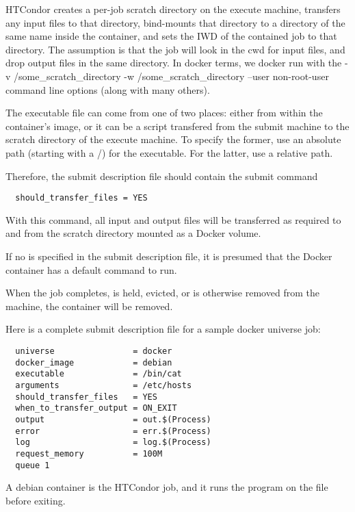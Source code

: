 HTCondor creates a per-job scratch directory on the execute machine, transfers 
any input files to that directory, bind-mounts that directory to a directory 
of the same name inside the container, and sets the IWD of the contained job 
to that directory.  The assumption is that the job will look in the cwd for 
input files, and drop output files in the same directory.  In docker 
terms, we docker run with the -v /some\_scratch\_directory 
-w /some\_scratch\_directory --user non-root-user command line options 
(along with many others). 

The executable file can come from one of two places:  either from within
the container's image, or it can be a script transfered from the submit
machine to the scratch directory of the execute machine.  To specify the
former, use an absolute path (starting with a /) for the executable.  For
the latter, use a relative path.

Therefore,
the submit description file should contain the submit command
\begin{verbatim}
  should_transfer_files = YES
\end{verbatim}
With this command,  all input and output files will be transferred
as required to and from the scratch directory mounted as a
Docker volume.

If no  is specified in the submit description file,
it is presumed that the Docker container has a default command to run.

When the job completes, is held, evicted, 
or is otherwise removed from the machine, the container will be removed.

Here is a complete submit description file for a sample docker universe job:
\begin{verbatim}
  universe                = docker
  docker_image            = debian
  executable              = /bin/cat
  arguments               = /etc/hosts
  should_transfer_files   = YES
  when_to_transfer_output = ON_EXIT
  output                  = out.$(Process)
  error                   = err.$(Process)
  log                     = log.$(Process)
  request_memory          = 100M
  queue 1
\end{verbatim}

A debian container is the HTCondor job,
and it runs the  program on the  file
before exiting.

